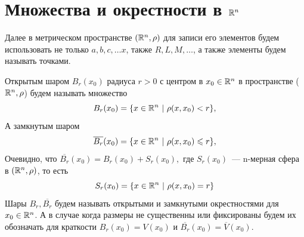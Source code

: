 \documentclass[../../main.tex]{subfiles}
\begin{document}
	
	\section{Множества и окрестности в $\mathbb{R}^n$}
	Далее в метрическом пространстве $(\mathbb{R}^n, \rho)$ для записи его элементов будем использовать не только $a, b, c, \dots x$, также $R, L, M, \dots$, а также элементы будем называть точками.
	
	Открытым шаром $B_r(x_0)$ радиуса $r > 0$ с центром в $x_0 \in \mathbb{R}^n$ в пространстве ($\mathbb{R}^n, \rho$) будем называть множество 
	$$
	B_r(x_0) = \{x \in \R^n\ |\ \rho(x, x_0) < r\}, 
	$$
	А замкнутым шаром
	$$
	\overline{B_r}(x_0) = \{x \in \mathbb{R}^n\ |\ \rho(x, x_0) \leqslant r\}, 
	$$ 
	Очевидно, что $\overline{B_r}(x_0) = B_r(x_0) + S_r(x_0),$ где $ S_r(x_0)$~--- n-мерная сфера в  $(\mathbb{R}^n, \rho)$, то есть 
	$$
	S_r(x_0) = \{x \in \mathbb{R}^n\ |\ \rho(x, x_0) = r\}
	$$ 
	Шары $B_r, \overline{B_r}$ будем называть открытыми и замкнутыми окрестностями для $x_0 \in \mathbb{R}^n$. А в случае когда размеры не существенны или фиксированы будем их обозначать для краткости $B_r(x_0) = V(x_0)$ и $\overline{B_r}(x_0) = \overline{V}(x_0)$.
	
\end{document}
